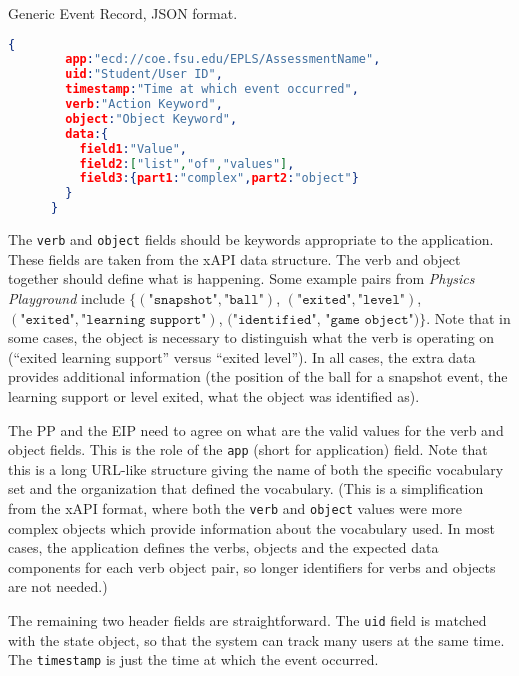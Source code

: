 \documentclass{article}
\begin{document}
  \begin{algorithm}
    \caption{Generic Event Record, JSON format.}
    \label{json:event1}
    \begin{lstlisting}[language=json]
      {
        app:"ecd://coe.fsu.edu/EPLS/AssessmentName",
        uid:"Student/User ID",
        timestamp:"Time at which event occurred",
        verb:"Action Keyword",
        object:"Object Keyword",
        data:{
          field1:"Value",
          field2:["list","of","values"],
          field3:{part1:"complex",part2:"object"}
        }
      }
  \end{lstlisting}
  \end{algorithm}

  The \texttt{verb} and \texttt{object} fields should be keywords
  appropriate to the application.  These fields are taken from the
  xAPI \cite{xAPI} data structure.  The verb and object together
  should define what is happening.  Some example pairs from
  \textit{Physics Playground} include $\{ (\texttt{"snapshot"},
  \texttt{"ball"})$, $(\texttt{"exited"}, \texttt{"level"})$, 
  $(\texttt{"exited"}, \texttt{"learning support"})$, $(\texttt{"identified"}$,
  $\texttt{"game object"}) \}$.  Note that in some cases, the object is
  necessary to distinguish what the verb is operating on (``exited
  learning support'' versus ``exited level'').  In all cases, the
  extra data provides additional information (the position of the ball
  for a snapshot event, the learning support or level exited, what the
  object was identified as).

  The PP and the EIP need to agree on what are the valid values for
  the verb and object fields.  This is the role of the \texttt{app}
  (short for application) field.  Note that this is a long URL-like
  structure giving the name of both the specific vocabulary set and
  the organization that defined the vocabulary.  (This is a
  simplification from the xAPI format, where both the \texttt{verb}
  and \texttt{object} values were more complex objects which provide
  information about the vocabulary used.  In most cases, the 
  application defines the verbs, objects and the expected data
  components for each verb object pair, so longer identifiers for
  verbs and objects are not needed.)

  The remaining two header fields are straightforward.  The
  \texttt{uid} field is matched with the state object, so that the
  system can track many users at the same time.  The
  \texttt{timestamp} is just the time at which the event occurred.
\end{document}

